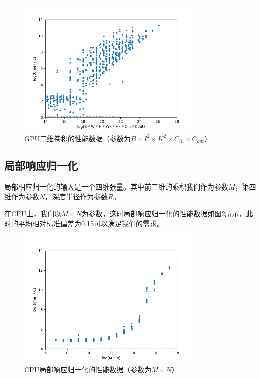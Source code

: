     \begin{figure}[!htbp]
        \centering
        \includegraphics[width=0.8\textwidth]{figures/conv_gpu.png}
        \caption{GPU二维卷积的性能数据（参数为$ B \times I^2 \times K^2 \times C_{in} \times C_{out} $）}
        \label{fig:conv_gpu}
    \end{figure}
    
\subsection{局部响应归一化}
    局部相应归一化的输入是一个四维张量。其中前三维的乘积我们作为参数$ M $，第四维作为参数$ N $，深度半径作为参数$ R $。

    在CPU上，我们以$ M \times N $为参数，这时局部响应归一化的性能数据如图\ref{fig:lrn_cpu}所示，此时的平均相对标准偏差为0.15可以满足我们的需求。
    
    \begin{figure}[!htbp]
        \centering
        \includegraphics[width=0.8\textwidth]{figures/lrn_cpu.png}
        \caption{CPU局部响应归一化的性能数据（参数为$ M \times N $）}
        \label{fig:lrn_cpu}
    \end{figure}


